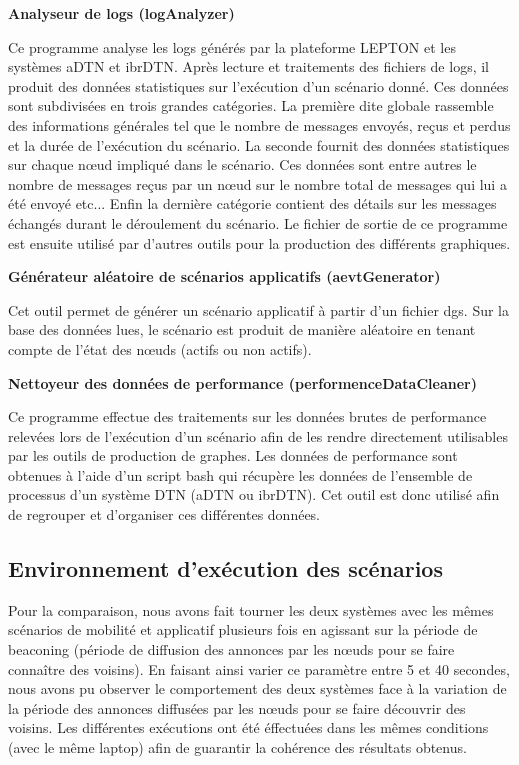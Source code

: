\documentclass[a4paper,10pt]{article}
\begin{document}
\noindent \textbf{Analyseur de logs (logAnalyzer)} \par
\noindent Ce programme analyse les logs générés par la plateforme LEPTON et les systèmes aDTN et ibrDTN. Après lecture et traitements des fichiers de logs, il produit des données statistiques sur l'exécution d'un scénario donné. Ces données sont subdivisées en trois grandes catégories. La première dite globale rassemble des informations générales tel que le nombre de messages envoyés, reçus et perdus et la durée de l'exécution du scénario. La seconde fournit des données statistiques sur chaque nœud impliqué dans le scénario. Ces données sont entre autres le nombre de messages reçus par un nœud sur le nombre total de messages qui lui a été envoyé etc... Enfin la dernière catégorie contient des détails sur les messages échangés durant le déroulement du scénario. Le fichier de sortie de ce programme est ensuite utilisé par d'autres outils pour la production des différents graphiques. \par

\noindent \textbf{Générateur aléatoire de scénarios applicatifs (aevtGenerator)} \par
\noindent Cet outil permet de générer un scénario applicatif à partir d'un fichier dgs. Sur la base des données lues, le scénario est produit de manière aléatoire en tenant compte de l'état des nœuds (actifs ou non actifs). \par

\noindent \textbf{Nettoyeur des données de performance (performenceDataCleaner)} \par
\noindent Ce programme effectue des traitements sur les données brutes de performance relevées lors de l'exécution d'un scénario afin de les rendre directement utilisables par les outils de production de graphes. Les données de performance sont obtenues à l'aide d'un script bash qui récupère les données de l'ensemble de processus d'un système DTN (aDTN ou ibrDTN). Cet outil est donc utilisé afin de regrouper et d'organiser ces différentes données. \par

\subsection {Environnement d'exécution des scénarios}
Pour la comparaison, nous avons fait tourner les deux systèmes avec les mêmes scénarios de mobilité et applicatif plusieurs fois en agissant sur la période de beaconing (période de diffusion des annonces par les nœuds pour se faire connaître des voisins). En faisant ainsi varier ce paramètre entre 5 et 40 secondes, nous avons pu observer le comportement des deux systèmes face à la variation de la période des annonces diffusées par les nœuds pour se faire découvrir des voisins. 
Les différentes exécutions ont été éffectuées dans les mêmes conditions (avec le même laptop) afin de guarantir la cohérence des résultats obtenus.
\end{document}
